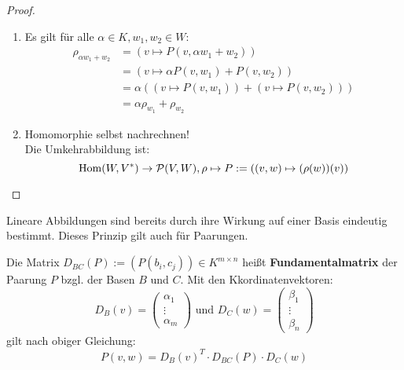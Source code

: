 \documentclass[parskip,a4paper,twoside,DIV15,BCOR12mm]{scrbook}
\begin{document}
\begin{proof}
\begin{enumerate}
\item Es gilt für alle $\alpha\in K,w_1,w_2\in W$:
\begin{align*}
\rho_{\alpha w_1+w_2}&=(v\mapsto P(v,\alpha w_1+w_2))\\
&=(v\mapsto \alpha P(v,w_1)+P(v,w_2))\\
&=\alpha((v\mapsto P(v,w_1))+(v\mapsto P(v,w_2)))\\
&=\alpha\rho_{w_1}+\rho_{w_2} 
\end{align*}
\item Homomorphie selbst nachrechnen!\\
Die Umkehrabbildung ist:
\[\operatorname{Hom}(W,V^*)\to \mathcal{P}(V,W),\rho\mapsto P:=((v,w)\mapsto(\rho(w))(v))\]
\end{enumerate}
\end{proof}

\begin{remind}
Lineare Abbildungen sind bereits durch ihre Wirkung auf einer Basis eindeutig
bestimmt. Dieses Prinzip gilt auch für Paarungen.
\end{remind}

\begin{comment}
\index{bilineare Fortsetzung}\index{Fortsetzung!bilineare}
Seien $V,W$ $K$-VRme mit jeweiliger Basis $B:=\{b_1,\ldots,b_m\}\subseteq V,
C:=\{c_1,\ldots,c_n\}\subseteq W$, so ist eine Paarung $P$ auf $V\times W$
Bereits durch ihre Einschränkung auf $B\times C$ festgelegt.\\
Für $v:=\sum_{i=1}^m \alpha_i b_i,w:=\sum_{j=1}^n \beta_j c_j$ gilt:
\[P(v,w)=\sum_{i=1}^m\sum_{j=1}^n \alpha_i\beta_j\cdot P(b_i,c_j)\]
Jede Abbildung $P':B\times C\to K$ definiert über diese Gleichung eine Paarung
$P':V\times W\to K$. Diese heißt \textbf{bilineare Fortsetzung}.
\end{comment}

\begin{definition}
Die Matrix $D_{BC}(P):=(P(b_i,c_j))\in K^{m\times n}$ heißt \textbf{Fundamentalmatrix}
der Paarung $P$ bzgl. der Basen $B$ und $C$. Mit den Kkordinatenvektoren:
\[D_B(v)=\begin{pmatrix}\alpha_1\\\vdots\\\alpha_m\end{pmatrix}\text{ und }
D_C(w)=\begin{pmatrix}\beta_1\\\vdots\\\beta_n\end{pmatrix}\]
gilt nach obiger Gleichung:
\[P(v,w)=D_B(v)^T\cdot D_{BC}(P)\cdot D_C(w)\]
\end{definition}
\end{document}
